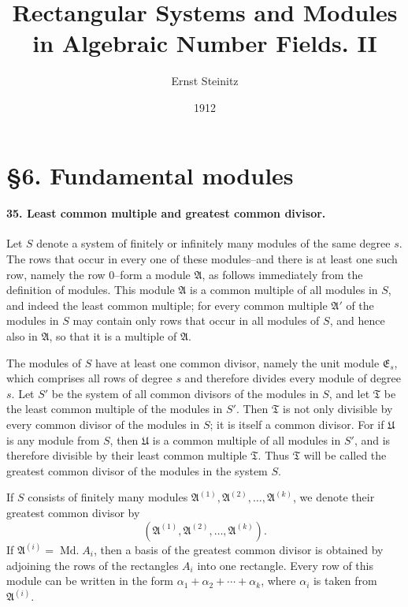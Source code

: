 \documentclass[11pt]{article}
\title{Rectangular Systems and Modules in Algebraic Number Fields. II}
\author{Ernst Steinitz}
\date{1912}
\newcommand{\Md}{\operatorname{Md.}}
\begin{document}
\maketitle

\section*{\S 6. Fundamental modules}

\paragraph{35. Least common multiple and greatest common divisor.}
Let $S$ denote a system of finitely or infinitely many modules of the same degree $s$. The rows that occur in every one of these modules--and there is at least one such row, namely the row $0$--form a module $\mathfrak A$, as follows immediately from the definition of modules. This module $\mathfrak A$ is a common multiple of all modules in $S$, and indeed the least common multiple; for every common multiple $\mathfrak A'$ of the modules in $S$ may contain only rows that occur in all modules of $S$, and hence also in $\mathfrak A$, so that it is a multiple of $\mathfrak A$.

The modules of $S$ have at least one common divisor, namely the unit module $\mathfrak E_s$, which comprises all rows of degree $s$ and therefore divides every module of degree $s$. Let $S'$ be the system of all common divisors of the modules in $S$, and let $\mathfrak T$ be the least common multiple of the modules in $S'$. Then $\mathfrak T$ is not only divisible by every common divisor of the modules in $S$; it is itself a common divisor. For if $\mathfrak U$ is any module from $S$, then $\mathfrak U$ is a common multiple of all modules in $S'$, and is therefore divisible by their least common multiple $\mathfrak T$. Thus $\mathfrak T$ will be called the greatest common divisor of the modules in the system $S$.

If $S$ consists of finitely many modules $\mathfrak A^{(1)},\mathfrak A^{(2)},\ldots,\mathfrak A^{(k)}$, we denote their greatest common divisor by
\[
(\mathfrak A^{(1)},\mathfrak A^{(2)},\ldots,\mathfrak A^{(k)}).
\]
If $\mathfrak A^{(i)}=\Md A_i$, then a basis of the greatest common divisor is obtained by adjoining the rows of the rectangles $A_i$ into one rectangle. Every row of this module can be written in the form $\alpha_1+
\alpha_2+
\cdots+
\alpha_k$, where $\alpha_i$ is taken from $\mathfrak A^{(i)}$.
\end{document}

